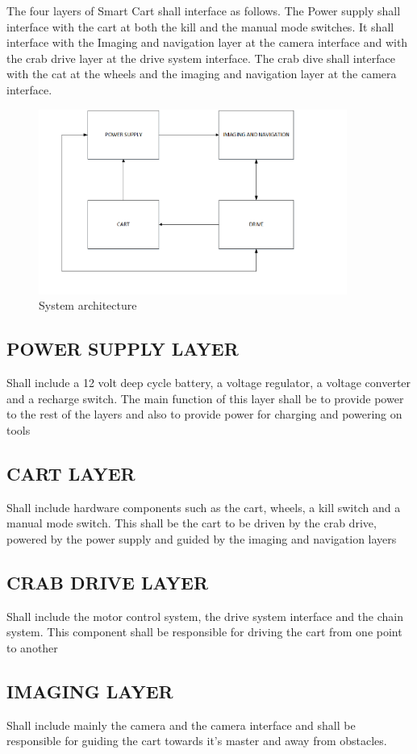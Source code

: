 The four layers of Smart Cart shall interface as follows. The Power supply shall interface with the cart at both the kill and the manual mode switches. It shall interface with the Imaging and navigation layer at the camera interface and with the crab drive layer at the drive system interface. The crab dive shall interface with the cat at the wheels and the imaging and navigation layer at the camera interface. 
\newpage
\begin{figure}[h!]
	\centering
 	\includegraphics[width=0.90\textwidth]{images/SMART_CART}
 \caption{System architecture}
\end{figure}
\subsection{POWER SUPPLY LAYER}
Shall include a 12 volt deep cycle battery, a voltage regulator, a voltage converter and a recharge switch. The main function of this layer shall be to provide power to the rest of the layers and also to provide power for charging and powering on tools
\subsection{CART LAYER}
Shall include hardware components such as the cart, wheels, a kill switch and a manual mode switch. This shall be the cart to be driven by the crab drive, powered by the power supply and guided by the imaging and navigation layers
\subsection{CRAB DRIVE LAYER}
Shall include the motor control system, the drive system interface and the chain system. This component shall be responsible for driving the cart from one point to another
\subsection{IMAGING LAYER}
Shall include mainly the camera and the camera interface and shall be responsible for guiding the cart towards it's master and away from obstacles. 

